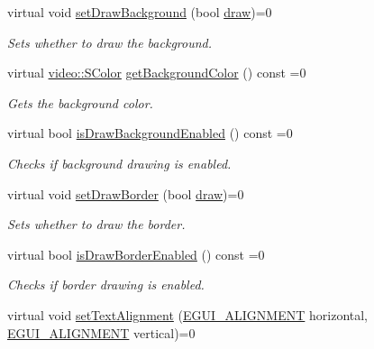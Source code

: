 \begin{DoxyCompactItemize}
\mbox{\label{classirr_1_1gui_1_1IGUIStaticText_aed8ab71280b2c1787c62565d199c0c34}} 
virtual void \hyperlink{classirr_1_1gui_1_1IGUIStaticText_aed8ab71280b2c1787c62565d199c0c34}{set\+Draw\+Background} (bool \hyperlink{classirr_1_1gui_1_1IGUIElement_a1ef7eeaff67b8a9f4f37cacdc7e54be2}{draw})=0
\begin{DoxyCompactList}\small\item\em Sets whether to draw the background. \end{DoxyCompactList}\item 
virtual \hyperlink{classirr_1_1video_1_1SColor}{video\+::\+S\+Color} \hyperlink{classirr_1_1gui_1_1IGUIStaticText_a7149fff0b2c4159503f114807e0b0a83}{get\+Background\+Color} () const =0
\begin{DoxyCompactList}\small\item\em Gets the background color. \end{DoxyCompactList}\item 
virtual bool \hyperlink{classirr_1_1gui_1_1IGUIStaticText_ab6da7f10a72d023729d12c85e2926aec}{is\+Draw\+Background\+Enabled} () const =0
\begin{DoxyCompactList}\small\item\em Checks if background drawing is enabled. \end{DoxyCompactList}\item 
\mbox{\label{classirr_1_1gui_1_1IGUIStaticText_a48e8662debdf36b4eb3319a5fee937c6}} 
virtual void \hyperlink{classirr_1_1gui_1_1IGUIStaticText_a48e8662debdf36b4eb3319a5fee937c6}{set\+Draw\+Border} (bool \hyperlink{classirr_1_1gui_1_1IGUIElement_a1ef7eeaff67b8a9f4f37cacdc7e54be2}{draw})=0
\begin{DoxyCompactList}\small\item\em Sets whether to draw the border. \end{DoxyCompactList}\item 
virtual bool \hyperlink{classirr_1_1gui_1_1IGUIStaticText_a52478a36f77cfbc62e1f57a486e0a083}{is\+Draw\+Border\+Enabled} () const =0
\begin{DoxyCompactList}\small\item\em Checks if border drawing is enabled. \end{DoxyCompactList}\item 
virtual void \hyperlink{classirr_1_1gui_1_1IGUIStaticText_ad8635f1247971277543cfff6e1fa9277}{set\+Text\+Alignment} (\hyperlink{namespaceirr_1_1gui_a19eb5fb40e67f108cb16aba922ddaa2d}{E\+G\+U\+I\+\_\+\+A\+L\+I\+G\+N\+M\+E\+NT} horizontal, \hyperlink{namespaceirr_1_1gui_a19eb5fb40e67f108cb16aba922ddaa2d}{E\+G\+U\+I\+\_\+\+A\+L\+I\+G\+N\+M\+E\+NT} vertical)=0

\end{DoxyCompactItemize}
